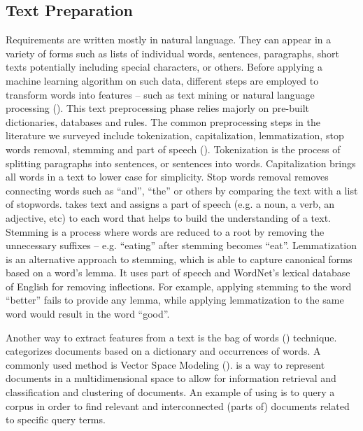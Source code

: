 \subsection{Text Preparation}
\label{sec:preprocessing}

Requirements are written mostly in natural language. They can appear in a
variety of forms such as lists of individual words, sentences, paragraphs, short
texts potentially including special characters, or others. Before applying a
machine learning algorithm on such data, different steps are employed to
transform words into features -- such as text mining or natural language
processing (\NLP). This text preprocessing phase relies majorly on pre-built
dictionaries, databases and rules. The common preprocessing steps in the
literature we surveyed include tokenization, capitalization, lemmatization, stop
words removal, stemming and part of speech (\POS). Tokenization is the process
of splitting paragraphs into sentences, or sentences into words. Capitalization
brings all words in a text to lower case for simplicity. Stop words removal
removes connecting words such as ``and'', ``the'' or others by comparing the
text with a list of stopwords. \POS takes text and assigns a part of speech
(e.g. a noun, a verb, an adjective, etc) to each word that helps to build the
understanding of a text. Stemming is a process where words are reduced to a root
by removing the unnecessary suffixes -- e.g. ``eating'' after stemming becomes
``eat''. Lemmatization is an alternative approach to stemming, which is able to
capture canonical forms based on a word's lemma. It uses part of speech and WordNet’s
lexical database of English for removing inflections. For
example, applying stemming to the word ``better'' fails to provide any lemma,
while applying lemmatization to the same word would result in the word ``good''.

 Another way to extract features from a text is the bag of words (\BOW)
 technique. \BOW categorizes documents based on a dictionary and occurrences of
 words. A commonly used \BOW method is Vector Space Modeling
 (\VSM). \VSM is a way to represent documents in a multidimensional space to
 allow for information retrieval and classification and clustering of documents.
 An example of using \VSM is to query a corpus in order to find relevant and
 interconnected (parts of) documents related to specific query terms.

